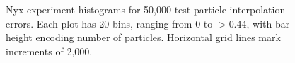 \begin{figure}
\caption{Nyx experiment histograms for 50,000 test particle interpolation errors. Each plot has 20 bins, ranging from 0 to $>$0.44, with bar height encoding number of particles. Horizontal grid lines mark increments of 2,000.}
\label{fig:nyx_hist}
\end{figure}

